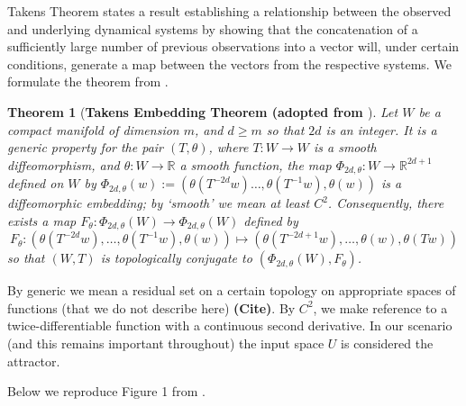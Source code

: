 \documentclass[a4paper,12pt,twoside]{report}
\newtheorem{Theorem}{Theorem}[]
\newcommand{\Ftheta}{\ensuremath{F_\theta}}
\begin{document}
Takens Theorem states a result establishing a relationship between the observed and underlying dynamical systems by showing that the concatenation of a sufficiently large number of previous observations into a vector will, under certain conditions, generate a map between the vectors from the respective systems.  We formulate the theorem from \cite{takens1981detecting}.  

\begin{Theorem} 
	[\bf Takens Embedding Theorem (adopted from \cite{takens1981detecting}] \label{Thm_Takens}
         Let $W$ be a compact manifold of dimension $m$, and $d\ge m$ so that $2d$ is an integer. It is a 
            generic property for the pair $(T, \theta)$,  where $T:W \to W$ is
            a smooth diffeomorphism, and $\theta:W \to \mathbb{R}$ a smooth function, the map $\Phi_{2d,\theta}:W \to \mathbb{R}^{2d+1}$ defined on $W$ by 
            $\Phi_{2d,\theta}(w) := (\theta(T^{-2d}w)\ldots,\theta(T^{-1}w),\theta(w))$
            is a diffeomorphic embedding; by `smooth' we mean at least $C^2$. Consequently, there exists a map $F_\theta: \Phi_{2d,\theta}(W) \to \Phi_{2d,\theta}(W)$ defined by $$F_\theta: (\theta(T^{-2d}w),\ldots,\theta(T^{-1}w),\theta(w)) \mapsto 
            (\theta(T^{-2d+1}w),\ldots,\theta(w),\theta(Tw))$$
           so that $(W,T)$ is topologically conjugate to 
            $(\Phi_{2d,\theta}(W), F_\theta)$.    
\end{Theorem} 

By generic we mean a residual set on a certain topology on appropriate spaces of functions (that we do not describe here) \textbf{(Cite)}.  %
By $C^2$, we make reference to a twice-differentiable function  with a continuous second derivative. In our scenario (and this remains important throughout) the input space $U$ is considered the attractor.~\label{attractor_U}

Below we reproduce Figure 1 from \cite{Supp}.

\end{document}
